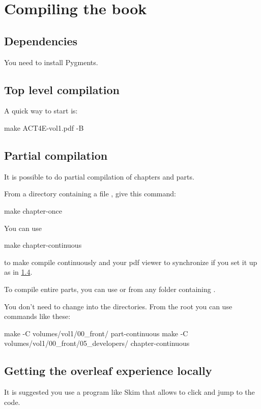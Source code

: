 

\section{Compiling the book}

\subsection{Dependencies}

You need to install Pygments.

\subsection{Top level compilation}

A quick way to start is:

\begin{console}
  make ACT4E-vol1.pdf -B
\end{console}

\subsection{Partial compilation}

It is possible to do partial compilation of chapters and parts.


From a directory containing a file , give this command:

\begin{console}
  make chapter-once
\end{console}

You can use
%
\begin{console}
  make chapter-continuous
\end{console}
%
to make  compile continuously and your pdf viewer to synchronize if you set it up as in \cref{sub:overleaf-experience}.

To compile entire parts, you can use  or  from any folder containing
.

You don't need to change into the directories.
From the root you can use commands like these:
%
\begin{console}
  make -C volumes/vol1/00_front/ part-continuous
  make -C volumes/vol1/00_front/05_developers/ chapter-continuous
\end{console}

\subsection{Getting the overleaf experience locally}
\label{sub:overleaf-experience}
It is suggested you use a program like Skim that allows to click and jump to the code.

